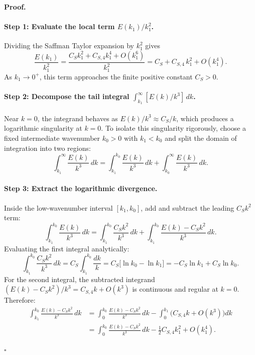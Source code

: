 \documentclass[lineno]{jfm}
\newenvironment{proof}[1][Proof]{\noindent\textbf{#1.} }{\hfill$\square$\medskip}
\begin{document}
\begin{proof}
\paragraph{Step 1: Evaluate the local term $E(k_1)/k_1^2$.}
Dividing the Saffman Taylor expansion by $k_1^2$ gives
\begin{equation}
\frac{E(k_1)}{k_1^2} = \frac{C_S k_1^2 + C_{S,4} k_1^4 + O(k_1^6)}{k_1^2} = C_S + C_{S,4}\,k_1^2 + O(k_1^4).
\label{eq:saffman_term1}
\end{equation}
As $k_1 \to 0^+$, this term approaches the finite positive constant $C_S > 0$.

\paragraph{Step 2: Decompose the tail integral $\int_{k_1}^\infty [E(k)/k^3]\,dk$.}
Near $k = 0$, the integrand behaves as $E(k)/k^3 \approx C_S / k$, which produces a logarithmic singularity at $k = 0$. To isolate this singularity rigorously, choose a fixed intermediate wavenumber $k_0 > 0$ with $k_1 < k_0$ and split the domain of integration into two regions:
\begin{equation}
\int_{k_1}^\infty \frac{E(k)}{k^3}\,dk = \int_{k_1}^{k_0} \frac{E(k)}{k^3}\,dk + \int_{k_0}^\infty \frac{E(k)}{k^3}\,dk.
\label{eq:saffman_split}
\end{equation}

\paragraph{Step 3: Extract the logarithmic divergence.}
Inside the low-wavenumber interval $[k_1, k_0]$, add and subtract the leading $C_S k^2$ term:
\begin{equation}
\int_{k_1}^{k_0} \frac{E(k)}{k^3}\,dk = \int_{k_1}^{k_0} \frac{C_S k^2}{k^3}\,dk + \int_{k_1}^{k_0} \frac{E(k) - C_S k^2}{k^3}\,dk.
\end{equation}
Evaluating the first integral analytically:
\begin{equation}
\int_{k_1}^{k_0} \frac{C_S k^2}{k^3}\,dk = C_S \int_{k_1}^{k_0} \frac{dk}{k} = C_S \Big[ \ln k_0 - \ln k_1 \Big] = -C_S \ln k_1 + C_S \ln k_0.
\end{equation}
For the second integral, the subtracted integrand $(E(k) - C_S k^2)/k^3 = C_{S,4} k + O(k^3)$ is continuous and regular at $k = 0$. Therefore:
\begin{align}
\int_{k_1}^{k_0} \frac{E(k) - C_S k^2}{k^3}\,dk &= \int_0^{k_0} \frac{E(k) - C_S k^2}{k^3}\,dk - \int_0^{k_1} \Big( C_{S,4} k + O(k^3) \Big) dk \nonumber \\
&= \int_0^{k_0} \frac{E(k) - C_S k^2}{k^3}\,dk - \frac{1}{2} C_{S,4} k_1^2 + O(k_1^4).
\end{align}


\end{proof}
\end{document}
